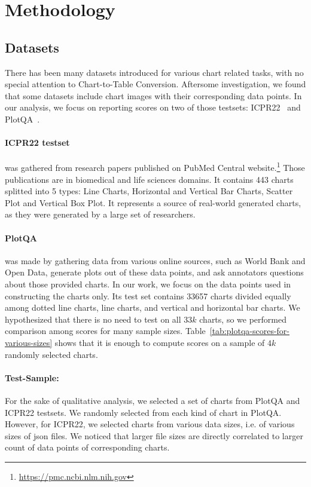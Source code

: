 \documentclass[
	letterpaper, %
]{jdf}
\begin{document}
\section{Methodology}\label{sect:methodology}
\subsection{Datasets}\label{ssect:datasets}
There has been many datasets introduced for various chart related tasks, with no special attention to Chart-to-Table Conversion.
Aftersome investigation, we found that some datasets include chart images with their corresponding data points.
In our analysis, we focus on reporting scores on two of those testsets: ICPR22~\cite{rousseau2023pattern} and PlotQA~\cite{methani2020plotqa}.

\paragraph{ICPR22 testset~\cite{rousseau2023pattern}} was gathered from research papers published on PubMed Central website.\footnote{\href{https://pmc.ncbi.nlm.nih.gov}{https://pmc.ncbi.nlm.nih.gov}}
Those publications are in biomedical and life sciences domains.
It contains 443 charts splitted into 5 types: Line Charts, Horizontal and Vertical Bar Charts, Scatter Plot and Vertical Box Plot.
It represents a source of real-world generated charts, as they were generated by a large set of researchers.

\paragraph{PlotQA~\cite{methani2020plotqa}} was made by gathering data from various online sources, such as World Bank and Open Data, generate plots out of these data points, and ask annotators questions about those provided charts.
In our work, we focus on the data points used in constructing the charts only.
Its test set contains 33657 charts divided equally among dotted line charts, line charts, and vertical and horizontal bar charts.
We hypothesized that there is no need to test on all $33k$ charts, so we performed comparison among scores for many sample sizes.
Table~\ref{tab:plotqa-scores-for-various-sizes} shows that it is enough to compute scores on a sample of $4k$ randomly selected charts.

\paragraph{Test-Sample:} For the sake of qualitative analysis, we selected a set of charts from PlotQA and ICPR22 testsets.
We randomly selected from each kind of chart in PlotQA.
However, for ICPR22, we selected charts from various data sizes, i.e. of various sizes of json files.
We noticed that larger file sizes are directly correlated to larger count of data points of corresponding charts.
\end{document}
